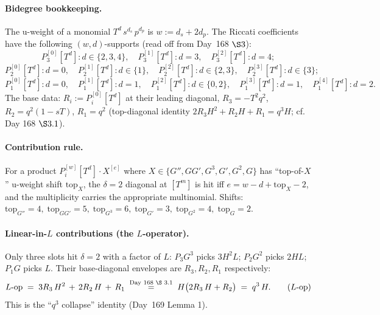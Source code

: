 \documentclass[11pt]{article}
\begin{document}
\paragraph{Bidegree bookkeeping.}
The u-weight of a monomial $T^d\, s^{d_s}\, p^{d_p}$ is
$w := d_s + 2 d_p$. The Riccati coefficients have the following
$(w, d)$-supports (read off from Day~168 $\S 3$):
\[
  P_3^{[0]}[T^d]: d\in\{2,3,4\},\quad
  P_3^{[1]}[T^d]: d = 3,\quad
  P_3^{[2]}[T^d]: d = 4;
\]
\[
  P_2^{[0]}[T^d]: d=0,\quad P_2^{[1]}[T^d]: d\in\{1\},\quad
  P_2^{[2]}[T^d]: d\in\{2,3\},\quad P_2^{[3]}[T^d]: d\in\{3\};
\]
\[
  P_1^{[0]}[T^d]: d=0,\quad P_1^{[1]}[T^d]: d=1,\quad
  P_1^{[2]}[T^d]: d\in\{0,2\},\quad P_1^{[3]}[T^d]: d=1,\quad P_1^{[4]}[T^d]: d=2.
\]
The base data: $R_i := P_i^{[0]}[T^{d}]$ at their leading diagonal,
$R_3 = -T^2 q^2$, $R_2 = q^2(1-sT)$, $R_1 = q^2$ (top-diagonal
identity $2 R_3 H^2 + R_2 H + R_1 = q^3 H$; cf. Day 168 $\S 3.1$).

\paragraph{Contribution rule.}
For a product $P_i^{[w]}[T^d] \cdot X^{[e]}$ where $X \in
\{G'', GG', G^3, G', G^2, G\}$ has ``top-of-$X$'' u-weight shift
$\mathrm{top}_X$, the $\delta = 2$ diagonal at $[T^m]$ is hit iff
$e = w - d + \mathrm{top}_X - 2$, and the multiplicity carries the
appropriate multinomial. Shifts:
$\mathrm{top}_{G''}{=}4,\;\mathrm{top}_{GG'}{=}5,\;\mathrm{top}_{G^3}{=}6,\;\mathrm{top}_{G'}{=}3,\;\mathrm{top}_{G^2}{=}4,\;\mathrm{top}_G{=}2$.

\paragraph{Linear-in-$L$ contributions (the $L$-operator).}
Only three slots hit $\delta = 2$ with a factor of $L$:
$P_3 G^3$ picks $3 H^2 L$; $P_2 G^2$ picks $2 H L$; $P_1 G$ picks $L$.
Their base-diagonal envelopes are $R_3, R_2, R_1$ respectively:
\[
  L\text{-op} \;=\; 3 R_3\, H^2 \,+\, 2 R_2\, H \,+\, R_1
  \;\stackrel{\text{Day~168 \S 3.1}}{=}\;
  H\bigl(2 R_3\, H + R_2\bigr)
  \;=\; q^3\, H. \tag{$L$-op}
\]
This is the ``$q^3$ collapse'' identity (Day~169 Lemma 1).
\end{document}
